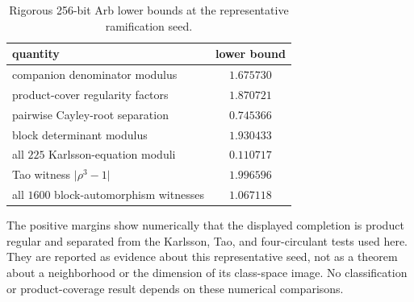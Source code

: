 \documentclass[aps,prx,reprint,nofootinbib,twoside,superscriptaddress,longbibliography,floatfix]{revtex4-2}
\theoremstyle{definition}
\begin{document}
\begin{table}[h]
\caption[Rigorous 256-bit Arb lower bounds at the representative ramification seed.]
{{Rigorous 256-bit Arb lower bounds at the representative ramification seed.}}
\label{tab:supp-ramification-bounds}
\centering
\renewcommand{\arraystretch}{1.12}
\begin{tabular}{|l|c|}
\hline
quantity & lower bound\\
\hline
companion denominator modulus & $1.675730$\\
\hline
product-cover regularity factors & $1.870721$\\
\hline
pairwise Cayley-root separation & $0.745366$\\
\hline
block determinant modulus & $1.930433$\\
\hline
all $225$ Karlsson-equation moduli & $0.110717$\\
\hline
Tao witness $\lvert\rho^3-1\rvert$ & $1.996596$\\
\hline
all $1600$ block-automorphism witnesses & $1.067118$\\
\hline
\end{tabular}
\end{table}
The positive margins show numerically that the displayed completion is product regular and separated from the Karlsson, Tao, and four-circulant tests used here. They are reported as evidence about this representative seed, not as a theorem about a neighborhood or the dimension of its class-space image. No classification or product-coverage result depends on these numerical comparisons.


\ifdefined\SupplementOnly

\fi
\end{document}
